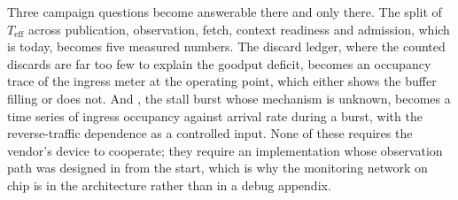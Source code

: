 Three campaign questions become answerable there and only there. The split of
$T_{\text{eff}}$ across publication, observation, fetch, context readiness and
admission, which is \evcal{} today, becomes five measured numbers. The
 discard ledger, where the counted discards are far too few to explain
the goodput deficit, becomes an occupancy trace of the ingress meter at the
operating point, which either shows the buffer filling or does not. And
, the stall burst whose mechanism is unknown, becomes a time series of
ingress occupancy against arrival rate during a burst, with the reverse-traffic
dependence as a controlled input. None of these requires the vendor's device to
cooperate; they require an implementation whose observation path was designed
in from the start, which is why the monitoring network on chip is in the
architecture rather than in a debug appendix.
